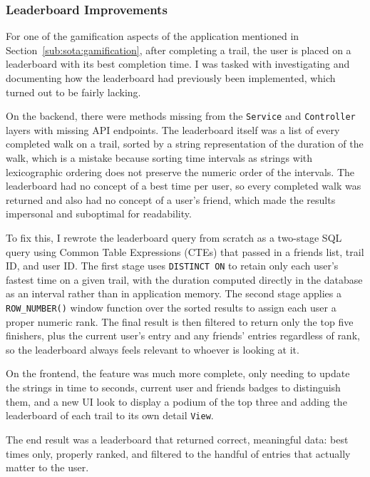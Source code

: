 \documentclass[11pt,a4paper]{article}
\begin{document}
\subsubsection{Leaderboard Improvements}
\label{subsub:leaderboard}

For one of the gamification aspects of the application mentioned in Section~\ref{sub:sota:gamification}, after completing a trail, the user is placed on a leaderboard with its best completion time.
I was tasked with investigating and documenting how the leaderboard had previously been implemented, which turned out to be fairly lacking.

On the backend, there were methods missing from the \texttt{Service} and \texttt{Controller} layers with missing API endpoints.
The leaderboard itself was a list of every completed walk on a trail, sorted by a string representation of the duration of the walk, which is a mistake because sorting time intervals as strings with lexicographic ordering does not preserve the numeric order of the intervals.
The leaderboard had no concept of a best time per user, so every completed walk was returned and also had no concept of a user's friend, which made the results impersonal and suboptimal for readability.

To fix this, I rewrote the leaderboard query from scratch as a two-stage SQL query using Common Table Expressions (CTEs) that passed in a friends list, trail ID, and user ID.
The first stage uses \texttt{DISTINCT ON} to retain only each user's fastest time on a given trail, with the duration computed directly in the database as an interval rather than in application memory.
The second stage applies a \texttt{ROW\_NUMBER()} window function over the sorted results to assign each user a proper numeric rank.
The final result is then filtered to return only the top five finishers, plus the current user's entry and any friends' entries regardless of rank, so the leaderboard always feels relevant to whoever is looking at it.

On the frontend, the feature was much more complete, only needing to update the strings in time to seconds, current user and friends badges to distinguish them, and a new UI look to display a podium of the top three and adding the leaderboard of each trail to its own detail \texttt{View}.
 
The end result was a leaderboard that returned correct, meaningful data: best times only, properly ranked, and filtered to the handful of entries that actually matter to the user.
\end{document}
